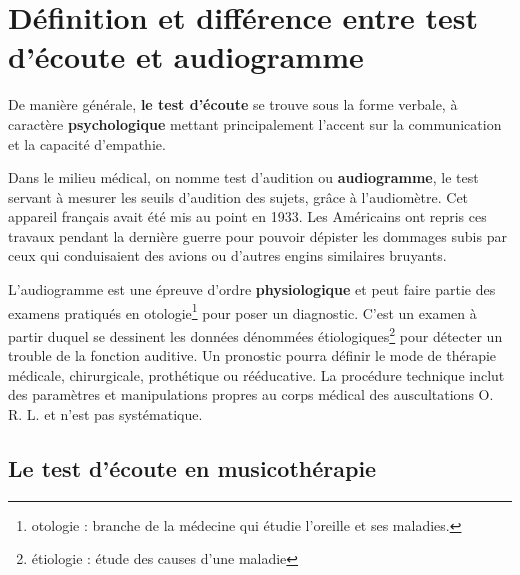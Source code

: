 \section{Définition et différence entre test d'écoute et audiogramme}

De manière générale, \textbf{le test d'écoute} se trouve sous la forme verbale,
à caractère
\textbf{psychologique} mettant principalement l'accent sur la communication
et la capacité d'empathie.

Dans le milieu médical, on nomme test d'audition ou \textbf{audiogramme}, le test servant à mesurer les seuils d'audition des sujets, grâce à l'audiomètre. Cet
appareil français avait été mis au point en 1933. Les Américains
ont repris ces travaux pendant la dernière guerre pour pouvoir dépister
les dommages subis par ceux qui conduisaient des avions ou d'autres
engins similaires bruyants.



  L'audiogramme est une épreuve d'ordre \textbf{ physiologique} et peut faire partie des examens  pratiqués en otologie\footnote{otologie : branche de la médecine
  	qui étudie l'oreille et ses maladies.} pour poser un diagnostic.
   C'est un examen à partir duquel se
  dessinent les données dénommées étiologiques\footnote{étiologie : étude des causes
  	d'une maladie} pour détecter un trouble de la fonction auditive. Un pronostic pourra définir le mode de thérapie
médicale, chirurgicale, prothétique ou rééducative. La procédure
technique inclut des paramètres et manipulations propres au corps
médical des auscultations O. R. L. et  n'est pas systématique.






\subsection{Le test d'écoute en musicothérapie}


